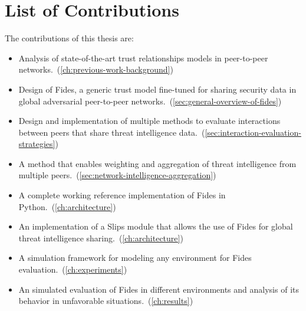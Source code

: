 \newpage
\section{List of Contributions}
\label{sec:list-of-contributions}
\noindent
The contributions of this thesis are:
\begin{itemize}
    \item Analysis of state-of-the-art trust relationships models in peer-to-peer networks.~(\ref{ch:previous-work-background})
    \item Design of Fides, a generic trust model fine-tuned for sharing security data in global adversarial peer-to-peer networks.~(\ref{sec:general-overview-of-fides})
    \item Design and implementation of multiple methods to evaluate interactions between peers that share threat intelligence data.~(\ref{sec:interaction-evaluation-strategies})
    \item A method that enables weighting and aggregation of threat intelligence from multiple peers.~(\ref{sec:network-intelligence-aggregation})
    \item A complete working reference implementation of Fides in Python.~(\ref{ch:architecture})
    \item An implementation of a Slips module that allows the use of Fides for global threat intelligence sharing.~(\ref{ch:architecture})
    \item A simulation framework for modeling any environment for Fides evaluation.~(\ref{ch:experiments})
    \item An simulated evaluation of Fides in different environments and analysis of its behavior in unfavorable situations.~(\ref{ch:results})
\end{itemize}
